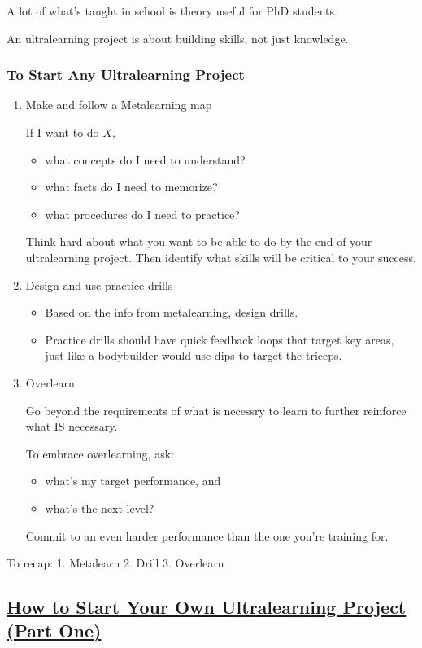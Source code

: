 A lot of what's taught in school is theory useful for PhD students.

An ultralearning project is about building skills, not just knowledge.

\subsubsection*{To Start Any Ultralearning Project}
\begin{enumerate}
	\item Make and follow a Metalearning map

	If I want to do $X$,
	\begin{itemize}
		\item what concepts do I need to understand?
		\item what facts do I need to memorize?
		\item what procedures do I need to practice?
	\end{itemize}


	Think hard about what you want to be able to do by the end of your ultralearning project. Then identify what skills will be critical to your success.

	\item Design and use practice drills
	\begin{itemize}
		\item Based on the info from metalearning, design drills.
		\item Practice drills should have quick feedback loops that target key areas, just like a bodybuilder would use dips to target the triceps.
	\end{itemize}

	\item Overlearn

	Go beyond the requirements of what is necessry to learn to further reinforce what IS necessary.

	To embrace overlearning, ask:
	\begin{itemize}
		\item what's my target performance, and
		\item what's the next level?
	\end{itemize}

	Commit to an even harder performance than the one you're training for.
\end{enumerate}

To recap:
1. Metalearn
2. Drill
3. Overlearn

\subsection{\href{https://www.scotthyoung.com/blog/2016/07/28/ultralearn-diy-1/}{How to Start Your Own Ultralearning Project (Part One)}}

